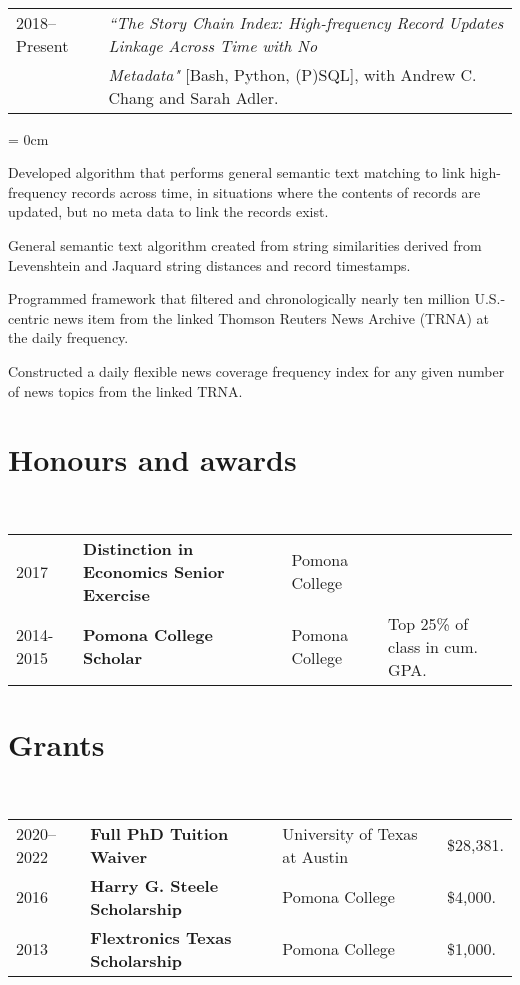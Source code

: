 \documentclass[a4paper, 11pt]{article}
\begin{document}
  ~\begin{tabular}{ll}
    2018--Present & \textit{``The Story Chain Index: High-frequency Record Updates Linkage Across Time with No}\\
    & \textit{Metadata"} {[Bash, Python, (P)SQL]}, with Andrew C. Chang and Sarah Adler.
  \end{tabular}
  \begin{compactitem}\parskip = 0cm
    \item Developed algorithm that performs general semantic text matching to link high-frequency records across time, in situations where the contents of records are updated, but no meta data to link the records exist.
    \item General semantic text algorithm created from string similarities derived from Levenshtein and Jaquard string distances and record timestamps.
    \item Programmed framework that filtered and chronologically nearly ten million U.S.-centric news item from the linked Thomson Reuters News Archive (TRNA) at the daily frequency.
    \item Constructed a daily flexible news coverage frequency index for any given number of news topics from the linked TRNA.
  \end{compactitem}
      
  \section{Honours and awards}
  ~\begin{tabular}{llll}
    2017 & \textbf{Distinction in Economics Senior Exercise} & Pomona College\\
    2014-2015 & \textbf{Pomona College Scholar} & Pomona College & Top 25\% of class in cum. GPA.\\
  \end{tabular}
      
  \section{Grants}
  ~\begin{tabular}{llll}
    2020--2022 & \textbf{Full PhD Tuition Waiver} & University of Texas at Austin & \$28,381. \\
    2016 & \textbf{Harry G. Steele Scholarship} & Pomona College & \$4,000.\\
    2013 & \textbf{Flextronics Texas Scholarship} & Pomona College & \$1,000.
  \end{tabular}
      
\end{document}
